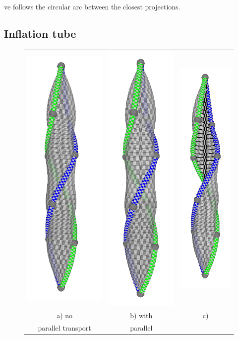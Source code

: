 \documentclass[journal, letterpaper]{IEEEtran}
\begin{document}
ve follows the circular arc between the closest projections.

\subsection{Inflation tube}
\begin{figure}
	\centering
		\begin{tabular}{ccc}
			\includegraphics[scale=0.7]{images/InflationNoParallelTransport.png} & \includegraphics[scale=0.7]{images/InflationParallelTransport.png} 
				& \includegraphics[scale=0.7]{images/InflationHalf.png}\\
			a) no  & b) with & c) \\
			parallel transport & parallel 
\end{tabular}
\end{figure}
\end{document}
